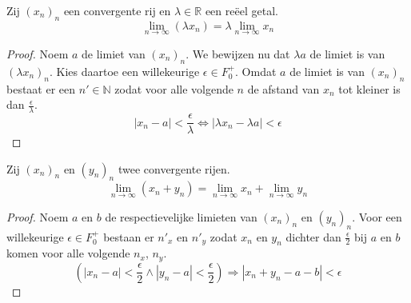 \documentclass[main.tex]{subfiles}
\begin{document}
\begin{st}
  Zij $(x_{n})_{n}$ een convergente rij en $\lambda\in \mathbb{R}$ een re\"eel getal.
  \[ \lim_{n \rightarrow \infty}(\lambda x_{n}) = \lambda \lim_{n\rightarrow \infty}x_{n} \]

  \begin{proof}
    Noem $a$ de limiet van $(x_{n})_{n}$.
    We bewijzen nu dat $\lambda a$ de limiet is van $(\lambda x_{n})_{n}$.
    Kies daartoe een willekeurige $\epsilon \in F_{0}^{+}$.
    Omdat $a$ de limiet is van $(x_{n})_{n}$ bestaat er een $n'\in \mathbb{N}$ zodat voor alle volgende $n$ de afstand van $x_{n}$ tot kleiner is dan $\frac{\epsilon}{\lambda}.$
    \[ |x_{n}-a| < \frac{\epsilon}{\lambda} \Leftrightarrow |\lambda x_{n}-\lambda a| < \epsilon \]
  \end{proof}
\end{st}

\begin{st}
  Zij $(x_{n})_{n}$ en $(y_{n})_{n}$ twee convergente rijen.
  \[ \lim_{n \rightarrow \infty}(x_{n}+y_{n}) = \lim_{n\rightarrow \infty}x_{n} + \lim_{n\rightarrow \infty}y_{n} \]

  \begin{proof}
    Noem $a$ en $b$ de respectievelijke limieten van $(x_{n})_{n}$ en $(y_{n})_{n}$.
    Voor een willekeurige $\epsilon \in F_{0}^{+}$ bestaan er $n'_{x}$ en $n'_{y}$ zodat $x_{n}$ en $y_{n}$ dichter dan $\frac{\epsilon}{2}$ bij $a$ en $b$ komen voor alle volgende $n_{x}$, $n_{y}$.
    \[ \left( |x_{n}-a| < \frac{\epsilon}{2} \wedge |y_{n}-a| < \frac{\epsilon}{2} \right) \Rightarrow |x_{n}+y_{n} - a-b| < \epsilon \]
  \end{proof}
\end{st}
\end{document}
